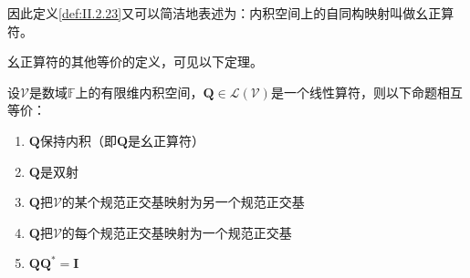 \documentclass[main.tex]{subfiles}
\begin{document}
因此定义\ref{def:II.2.23}又可以简洁地表述为：内积空间上的自同构映射叫做幺正算符。

幺正算符的其他等价的定义，可见以下定理。

\begin{theorem}\label{thm:II.2.33}
    设$\mathcal{V}$是数域$\mathbb{F}$上的有限维内积空间，$\mathbf{Q}\in\mathcal{L}\left(\mathcal{V}\right)$是一个线性算符，则以下命题相互等价：
    \begin{enumerate}
        \item $\mathbf{Q}$保持内积（即$\mathbf{Q}$是幺正算符）
        \item $\mathbf{Q}$是双射
        \item $\mathbf{Q}$把$\mathcal{V}$的某个规范正交基映射为另一个规范正交基
        \item $\mathbf{Q}$把$\mathcal{V}$的每个规范正交基映射为一个规范正交基
        \item $\mathbf{QQ}^*=\mathbf{I}$
    \end{enumerate}
\end{theorem}
\end{document}
